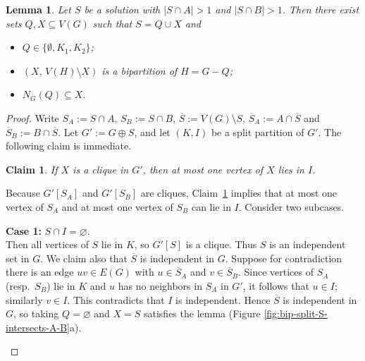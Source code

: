 \documentclass[11pt]{article}
\newtheorem{lemma}[theorem]{Lemma}
\newtheorem{claim}[theorem]{Claim}
\theoremstyle{definition}
\begin{document}
\begin{lemma}
\label{lemma:bipartite-split-characterization-1}
Let $S$ be a solution with $|S \cap A|>1$ and $|S\cap B|>1$.
Then there exist sets $Q,X\subseteq V(G)$ such that $S = Q \cup X$ and
\begin{itemize}
    \item $Q \in \{\emptyset,K_1,K_2\}$;
    \item $(X,\, V(H)\setminus X)$ is a bipartition of $H = G - Q$;
    \item $N_G(Q)\subseteq X$.
\end{itemize}
\end{lemma}
\begin{proof}
   Write $S_A:=S\cap A$, $S_B:=S\cap B$, $\overline S := V(G)\setminus S$, 
$\overline S_A := A \cap \overline{S}$ and $\overline S_B := B \cap \overline{S}$.
 Let $G' := G\oplus S$, and let $(K,I)$ be a split partition of $G'$.
The following claim is immediate.
\begin{claim}\label{claim:clique-at-most-one-in-I}
If $X$ is a clique in $G'$, then at most one vertex of $X$ lies in $I$.
\end{claim}

Because $G'[S_A]$ and $G'[S_B]$ are cliques, Claim~\ref{claim:clique-at-most-one-in-I} implies that at most one vertex of $S_A$ and at most one vertex of $S_B$ can lie in $I$. Consider two subcases.

\medskip\noindent\textbf{Case 1: } $S\cap I = \varnothing$.\\
Then all vertices of $S$ lie in $K$, so $G'[S]$ is a clique. Thus $S$ is an independent set in $G$. We claim also that $\overline S$ is independent in $G$. Suppose for contradiction there is an edge $uv\in E(G)$ with $u\in \overline{S}_A$ and $v\in \overline{S}_B$. Since vertices of $S_A$ (resp.\ $S_B$) lie in $K$ and $u$ has no neighbors in $S_A$ in $G'$, it follows that $u\in I$; similarly $v\in I$. This contradicts that $I$ is independent. Hence $\overline S$ is independent in $G$, so taking $Q=\varnothing$ and $X=S$ satisfies the lemma  (Figure \ref{fig:bip-split-S-intersects-A-B}a).

\label{fig:bip-split-S-intersects-A-B}
\begin{figure}[h]
\centering

\begin{subfigure}[b]{0.45\textwidth}
\centering
\begin{tikzpicture}[scale=1.1]


\end{tikzpicture}
\end{subfigure}
\end{figure}
\end{proof}
\end{document}
